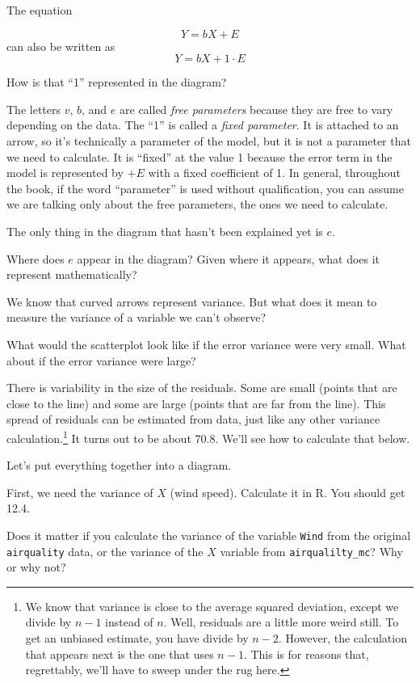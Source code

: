 \documentclass[
]{book}
\begin{document}
The equation

\[
Y = bX + E
\]
can also be written as
\[
Y = bX + 1 \cdot E
\]

How is that ``1'' represented in the diagram?

The letters \(v\), \(b\), and \(e\) are called \emph{free parameters} because they are free to vary depending on the data. The ``1'' is called a \emph{fixed parameter}. It is attached to an arrow, so it's technically a parameter of the model, but it is not a parameter that we need to calculate. It is ``fixed'' at the value 1 because the error term in the model is represented by \(+E\) with a fixed coefficient of 1. In general, throughout the book, if the word ``parameter'' is used without qualification, you can assume we are talking only about the free parameters, the ones we need to calculate.

The only thing in the diagram that hasn't been explained yet is \(e\).

Where does \(e\) appear in the diagram? Given where it appears, what does it represent mathematically?

We know that curved arrows represent variance. But what does it mean to measure the variance of a variable we can't observe?

What would the scatterplot look like if the error variance were very small. What about if the error variance were large?

There is variability in the size of the residuals. Some are small (points that are close to the line) and some are large (points that are far from the line). This spread of residuals can be estimated from data, just like any other variance calculation.\footnote{We know that variance is close to the average squared deviation, except we divide by \(n - 1\) instead of \(n\). Well, residuals are a little more weird still. To get an unbiased estimate, you have divide by \(n - 2\). However, the calculation that appears next is the one that uses \(n - 1\). This is for reasons that, regrettably, we'll have to sweep under the rug here.} It turns out to be about 70.8. We'll see how to calculate that below.

Let's put everything together into a diagram.

First, we need the variance of \(X\) (wind speed). Calculate it in R. You should get 12.4.

Does it matter if you calculate the variance of the variable \texttt{Wind} from the original \texttt{airquality} data, or the variance of the \(X\) variable from \texttt{airqualilty\_mc}? Why or why not?
\end{document}
